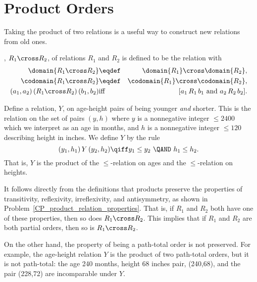 \section{Product Orders}\label{prodsec}

Taking the product of two relations is a useful way to construct new
relations from old ones.

\begin{definition}\label{productrel}
, $R_1 \cross R_2$, of relations
$R_1$ and $R_2$ is defined to be the relation with
\begin{eqnarray*}
\domain{R_1 \cross R_2} &\eqdef& \domain{R_1} \cross \domain{R_2},\\
\codomain{R_1 \cross R_2} &\eqdef& \codomain{R_1} \cross \codomain{R_2},\\
(a_1,a_2)\, (R_1 \cross R_2)\, (b_1,b_2) &\text{iff}& [a_1\, R_1\, b_1
\text{ and } a_2\, R_2\, b_2].
\end{eqnarray*}

\end{definition}

\begin{example}\label{Y}
Define a relation, $Y$, on age-height pairs of being younger \emph{and}
shorter.  This is the relation on the set of pairs $(y,h)$ where $y$ is a
nonnegative integer $\le 2400$ which we interpret as an age in months, and $h$
is a nonnegative integer $\le 120$ describing height in inches.  We define $Y$
by the rule
\[
(y_1,h_1)\, Y\, (y_2,h_2) \qiff y_1 \le y_2\ \QAND\ h_1 \le h_2.
\]
That is, $Y$ is the product of the $\le$-relation on ages and the
$\le$-relation on heights.
\end{example}

It follows directly from the definitions that products preserve the
properties of transitivity, reflexivity, irreflexivity, and
antisymmetry, as shown in
Problem~\ref{CP_product_relation_properties}.  That is, if $R_1$ and
$R_2$ both have one of these properties, then so does $R_1 \cross
R_2$.  This implies that if $R_1$ and $R_2$ are both partial orders,
then so is $R_1 \cross R_2$.

On the other hand, the property of being a path-total order is not preserved.
For example, the age-height relation $Y$ is the product of two path-total
orders, but it is not path-total: the age 240 months, height 68 inches pair,
(240,68), and the pair (228,72) are incomparable under $Y$.

